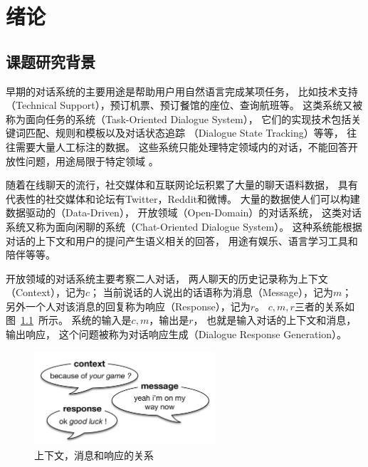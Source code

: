\chapter{绪论}\label{ch:introduction}

\section{课题研究背景}\label{sec:research_background}
早期的对话系统的主要用途是帮助用户用自然语言完成某项任务，
比如技术支持（Technical Support），预订机票、预订餐馆的座位、查询航班等。
这类系统又被称为面向任务的系统（Task-Oriented Dialogue System），
它们的实现技术包括关键词匹配、规则和模板以及对话状态追踪
（Dialogue State Tracking）等等，
往往需要大量人工标注的数据。
这些系统只能处理特定领域内的对话，不能回答开放性问题，用途局限于特定领域
。

随着在线聊天的流行，社交媒体和互联网论坛积累了大量的聊天语料数据，
具有代表性的社交媒体和论坛有Twitter，Reddit和微博。
大量的数据使人们可以构建数据驱动的（Data-Driven），
开放领域（Open-Domain）的对话系统，
这类对话系统又称为面向闲聊的系统（Chat-Oriented Dialogue System）。
这种系统能根据对话的上下文和用户的提问产生语义相关的回答，
用途有娱乐、语言学习工具和陪伴等等。

开放领域的对话系统主要考察二人对话，
两人聊天的历史记录称为上下文（Context），记为$c$；
当前说话的人说出的话语称为消息（Message），记为$m$；
另外一个人对该消息的回复称为响应（Response），记为$r$。
$c,m,r$三者的关系如图~\ref{fig:context_message_response}~所示。
系统的输入是$c, m$，输出是$r$，
也就是输入对话的上下文和消息，输出响应，
这个问题被称为对话响应生成（Dialogue Response Generation）。

\begin{figure}[H]
    \includegraphics[width=0.6\textwidth]{figure/context_message_response.png}
    \centering
    \caption{上下文，消息和响应的关系}
    \label{fig:context_message_response}
\end{figure}

